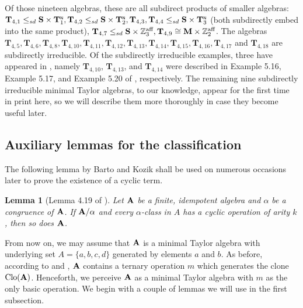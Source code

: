 \documentclass[11pt]{amsart}
\newcommand{\m}[1]{\mathbf{\uppercase{#1}}}
\newcommand{\n}{\scriptscriptstyle{\mathsf{N}}}
\newtheorem{lem}[thm]{Lemma}
\theoremstyle{definition}
\theoremstyle{remark}
\theoremstyle{plain}
\def\T{\mathbf{T}}
\begin{document}
Of those nineteen algebras, these are all subdirect products of smaller algebras: $\T_{4,1}\leq_{sd}\m s\times\T_1^{\n}, \T_{4,2}\leq_{sd}\m s\times\T_2^{\n},\T_{4,3},\T_{4,4}\leq_{sd}\m s\times\T_3^{\n}$ (both subdirectly embed into the same product), $\T_{4,7}\leq_{sd}\m s\times\mathbb{Z}_3^{\text{aff}}, \T_{4,9}\cong\m m\times\mathbb{Z}_2^{\text{aff}}$. The algebras $\T_{4,5},\T _{4,6},\T_{4,8},\T_{4,10},\T_{4,11},\T_{4,12},\T_{4,13},\T_{4,14},\T_{4,15},\T_{4,16},\T_{4,17}$ and $\T_{4,18}$ are subdirectly irreducible. Of the subdirectly irreducible examples, three have appeared in \cite{dreamteam}, namely $\T_{4,10}$, $\T_{4,13}$, and $\T_{4,14}$ were described in Example 5.16, Example 5.17, and Example 5.20 of \cite{dreamteam}, respectively. The remaining nine subdirectly irreducible minimal Taylor algebras, to our knowledge, appear for the first time in print here, so we will describe them more thoroughly in case they become useful later.

\subsection{Auxiliary lemmas for the classification}

The following lemma by Barto and Kozik shall be used on numerous occasions later to prove the existence of a cyclic term. 

\begin{lem}[Lemma 4.19 of \cite{BartoKozik}]\label{bkcyclic}
Let $\m A$ be a finite, idempotent algebra and $\alpha$ be a congruence of $\m A$. If ${\m A}/\alpha$ and every $\alpha$-class in $A$ has a cyclic operation of arity $k$, then so does $\m A$.
\end{lem}

From now on, we may assume that $\m a$ is a minimal Taylor algebra with underlying set $A=\{a,b,c,d\}$ generated by elements $a$ and $b$. As before, according to  and , $\m a$ contains a ternary operation $m$ which generates the clone $\mathrm{Clo}(\m a)$. Henceforth, we perceive $\m a$ as a minimal Taylor algebra with $m$ as the only basic operation. We begin with a couple of lemmas we will use in the first subsection.
\end{document}
